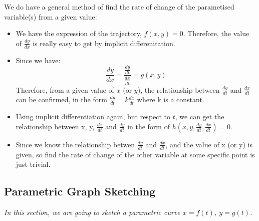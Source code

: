 \documentclass[12pt]{report}
\begin{document}
\noindent We do have a general method of find the rate of change of the parametised variable(s) from a given value:

\begin{itemize}
    \item We have the expression of the trajectory, $f(x, y) = 0$. Therefore, the value of $\frac{dy}{dx}$ 
    is really easy to get by implicit differenitation.
    \item Since we have:
    $$
    \frac{dy}{dx} = \frac{\frac{dy}{dt}}{\frac{dx}{dt}} = g(x, y)
    $$
    Therefore, from a given value of $x$ (or $y$), the relationship between $\frac{dy}{dt}$ and $\frac{dx}{dt}$ can be confirmed, 
    in the form $\frac{dy}{dt} = k \frac{dx}{dt}$ where k is a constant. 
    \item Using implicit differentiation again, but respect to $t$, we can get the relationship between x, y, $\frac{dx}{dt}$ and $\frac{dy}{dt}$
    in the form of $h(x, y, \frac{dy}{dt}, \frac{dx}{dt}) = 0$.
    \item Since we know the relationship betwen $\frac{dy}{dt}$ and $\frac{dx}{dt}$, and the value of x (or y) is given, so find the rate of change of the other variable at some specific point is just trivial.
\end{itemize}

\subsection{Parametric Graph Sketching}

\emph{In this section, we are going to sketch a parametric curve $x = f(t)$, $y = g(t)$.}
\newline
\end{document}
